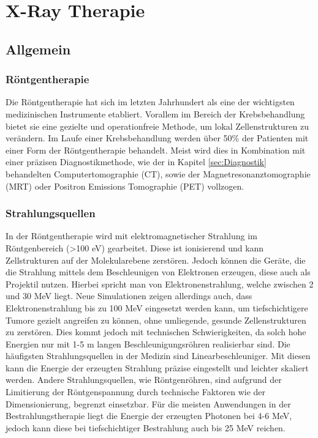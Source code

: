
\section{X-Ray Therapie}

\subsection{Allgemein}


\subsubsection{Röntgentherapie}
Die Röntgentherapie hat sich im letzten Jahrhundert als eine der wichtigsten medizinischen Instrumente etabliert.
Vorallem im Bereich der Krebsbehandlung bietet sie eine gezielte und operationfreie Methode, um lokal Zellenstrukturen zu verändern.
Im Laufe einer Krebsbehandlung werden über 50\% der Patienten mit einer Form der Röntgentherapie behandelt.
Meist wird dies in Kombination mit einer präzisen Diagnostikmethode, wie der in Kapitel \ref{sec:Diagnostik} behandelten Computertomographie (CT), sowie
der Magnetresonanztomographie (MRT) oder Positron Emissions Tomographie (PET) vollzogen. \cite{hoskin2019external}
\subsubsection{Strahlungsquellen}
In der Röntgentherapie wird mit elektromagnetischer Strahlung im Röntgenbereich (>100 eV) gearbeitet. 
Diese ist ionisierend und kann Zellstrukturen auf der Molekularebene zerstören.
Jedoch können die Geräte, die die Strahlung mittels dem Beschleunigen von Elektronen erzeugen, diese auch als Projektil nutzen.
Hierbei spricht man von Elektronenstrahlung, welche zwischen 2 und 30 MeV liegt.
Neue Simulationen zeigen allerdings auch, dass Elektronenstrahlung bis zu 100 MeV eingesetzt werden kann, um tiefschichtigere Tumore gezielt angreifen zu können, ohne umliegende, gesunde Zellenstrukturen zu zerstören.
Dies kommt jedoch mit technischen Schwierigkeiten, da solch hohe Energien nur mit 1-5 m langen Beschleunigungsröhren realisierbar sind. \cite{shady_author}
Die häufigsten Strahlungsquellen in der Medizin sind Linearbeschleuniger.
Mit diesen kann die Energie der erzeugten Strahlung präzise eingestellt und leichter skaliert werden.
Andere Strahlungsquellen, wie Röntgenröhren, sind aufgrund der Limitierung der Röntgenspannung durch technische Faktoren wie der Dimensionierung, begrenzt einsetzbar.
Für die meisten Anwendungen in der Bestrahlungstherapie liegt die Energie der erzeugten Photonen bei 4-6 MeV, jedoch kann diese bei tiefschichtiger Bestrahlung auch bis 25 MeV reichen. \cite{KriegerHannoSfTu}









